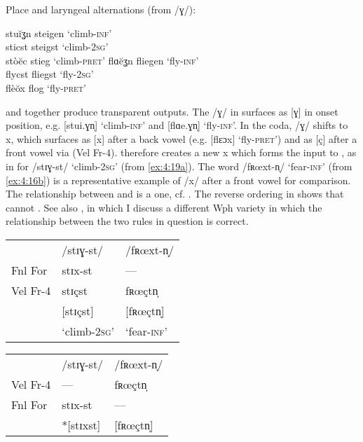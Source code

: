 \ea\label{ex:4:19}Place and laryngeal alternations (from /ɣ/):

\ea\label{ex:4:19a}  stuĭʓn  \tab [stui.ɣn̩] \tab  steigen \tab  ‘climb-\textsc{inf}’   \\
     sticst  \tab [stɪçst]   \tab steigst  \tab ‘climb-\textsc{2sg}’    \\
     stòĕc   \tab [stɔeç]    \tab stieg    \tab ‘climb-\textsc{pret}’ 
\ex\label{ex:4:19b}  flɑĕʓn  \tab [flɑe.ɣn̩] \tab  fliegen \tab  ‘fly-\textsc{inf}’     \\
      flycst \tab [flʏçst]   \tab fliegst  \tab ‘fly-\textsc{2sg}’       \\
      flèŏx  \tab [flɛox]    \tab flog     \tab ‘fly-\textsc{pret}’    
\z 
\z 

 and  together produce transparent outputs. The /ɣ/ in  surfaces as [ɣ] in onset position, e.g. [stui.ɣn̩] ‘climb-\textsc{inf}’ and [flɑe.ɣn̩] ‘fly-\textsc{inf}’. In the coda, /ɣ/ shifts to {\textbar}x{\textbar}, which surfaces as [x] after a back vowel (e.g. [flɛɔx] ‘fly-\textsc{pret}’) and as [ç] after a front vowel via  (Vel Fr-4).  therefore creates a new {\textbar}x{\textbar} which forms the input to , as in  for /stɪɣ-st/ ‘climb-\textsc{2sg}’ (from \ref{ex:4:19a}). The word /fʀœxt-n̩/ ‘fear-\textsc{inf}’ (from \ref{ex:4:16b}) is a representative example of /x/ after a front vowel for comparison. The relationship between  and  is a  one, cf. . The reverse ordering in  shows that  cannot  . See also , in which I discuss a different Wph variety in which the  relationship between the two rules in question is correct.

\ea%
    \label{ex:4:20}
\ea\label{ex:4:20a}\begin{tabular}[t]{@{} p{2cm}p{2.5cm}p{3cm} @{}}
         & /stɪɣ-st/             &  /fʀœxt-n̩/\\                
Fnl For  & stɪx-st   &  ---     \\
Vel Fr-4 &   stɪçst  &  fʀœçtn̩   \\            
         & [stɪçst]  & [fʀœçtn̩]  \\
         & ‘climb-\textsc{2sg}’  & ‘fear-\textsc{inf}’               
    \end{tabular}
\ex\label{ex:4:20b}
\begin{tabular}[t]{@{} p{2cm}p{2.5cm}p{3cm} @{}}
         &  /stɪɣ-st/            &  /fʀœxt-n̩/ \\
Vel Fr-4 &    ---                &   fʀœçtn̩   \\
 Fnl For &  stɪx-st              &   ---    \\
         & *[stɪxst]             &  [fʀœçtn̩]  \\
    \end{tabular}
\z 
\z 

